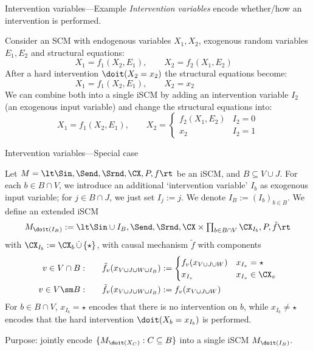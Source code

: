 \begin{frame}{Intervention variables---Example}
  \emph{Intervention variables} encode whether/how an intervention is performed.
  \begin{example}
    Consider an SCM with endogenous variables $X_1,X_2$, exogenous random variables $E_1,E_2$ and structural equations:
    $$X_1 = f_1(X_2,E_1), \qquad
      X_2 = f_2(X_1,E_2) \phantom{x_2}$$
    After a hard intervention $\doit(X_2=x_2)$ the structural equations become:
    $$X_1 = f_1(X_2,E_1), \qquad
      X_2 = x_2 \phantom{f_2(X_1,E_2)}$$
    We can combine both into a single iSCM by adding an intervention variable $I_2$ (an exogenous input variable) and change the structural equations into:
    $$X_1 = f_1(X_2,E_1), \qquad
      X_2 = \begin{cases}
        f_2(X_1,E_2) & I_2 = 0 \\
        x_2          & I_2 = 1
      \end{cases}$$
  \end{example}
\end{frame}

\begin{frame}{Intervention variables---Special case}
  \begin{Def}[\ref{def:scm_intervention_variables}]
  Let $M = \lt \Sin, \Send, \Srnd, \CX, P, f \rt$ be an iSCM, and $B \subseteq V \cup J$.
  For each $b \in B \cap V$, we introduce an additional `intervention variable' $I_b$ as exogenous input variable; for $j \in B \cap J$, we just set $I_j := j$.
  We denote $I_B := (I_b)_{b \in B}$.
  We define an extended iSCM 
  \vskip-2mm
  $$\textstyle M_{\doit(I_B)} := \lt \Sin \cup I_B, \Send, \Srnd, \CX \times \prod_{b \in B \cap V} \CX_{I_b}, P, \tilde{f} \rt$$
  with $\CX_{I_b} := \CX_b \,\dot\cup\, \{\star\}$, with causal mechanism $\tilde{f}$ with components
  \vskip-6mm
  \begin{align*}
    v \in V \cap B: \qquad &\tilde{f}_v(x_{V \cup J \cup W \cup I_B}) := \begin{cases}
      f_v(x_{V \cup J \cup W}) & x_{I_v} = \star \\
      x_{I_v} & x_{I_v} \in \CX_v
    \end{cases}\\
    v \in V \sm B: \qquad & \tilde{f}_v(x_{V \cup J \cup W \cup I_B}) := f_v(x_{V \cup J \cup W})
  \end{align*}
  \vskip-2mm
  For $b \in B \cap V$, $x_{I_b} = \star$ encodes that there is no intervention on $b$, while $x_{I_b} \ne \star$ encodes that the hard intervention $\doit(X_b = x_{I_b})$ is performed.
\end{Def}
Purpose: jointly encode $\{M_{\doit(X_C)} : C \subseteq B\}$ into a single iSCM $M_{\doit(I_B)}$.
\end{frame}

